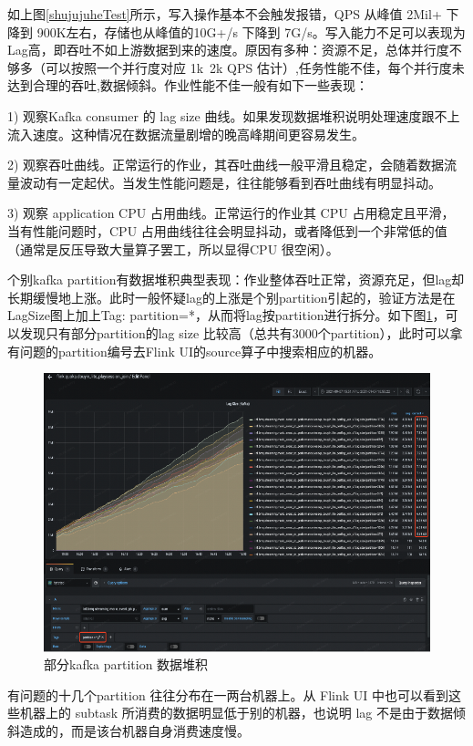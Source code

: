 \begin{longtable}[htbp]
如上图\ref{shujujuheTest}所示，写入操作基本不会触发报错，QPS 从峰值 2Mil+ 下降到 900K左右，存储也从峰值的10G+/s 下降到 7G/s。写入能力不足可以表现为Lag高，即吞吐不如上游数据到来的速度。原因有多种：资源不足，总体并行度不够多（可以按照一个并行度对应 1k~2k QPS 估计）,任务性能不佳，每个并行度未达到合理的吞吐,数据倾斜。作业性能不佳一般有如下一些表现：

1)	观察Kafka consumer 的 lag size 曲线。如果发现数据堆积说明处理速度跟不上流入速度。这种情况在数据流量剧增的晚高峰期间更容易发生。

2)	观察吞吐曲线。正常运行的作业，其吞吐曲线一般平滑且稳定，会随着数据流量波动有一定起伏。当发生性能问题是，往往能够看到吞吐曲线有明显抖动。

3)	观察 application CPU 占用曲线。正常运行的作业其 CPU 占用稳定且平滑，当有性能问题时，CPU 占用曲线往往会明显抖动，或者降低到一个非常低的值（通常是反压导致大量算子罢工，所以显得CPU 很空闲）。

个别kafka partition有数据堆积典型表现：作业整体吞吐正常，资源充足，但lag却长期缓慢地上涨。此时一般怀疑lag的上涨是个别partition引起的，验证方法是在LagSize图上加上Tag: partition=*，从而将lag按partition进行拆分。如下图\ref{bufenkafkaduiji}，可以发现只有部分partition的lag size 比较高（总共有3000个partition），此时可以拿有问题的partition编号去Flink UI的source算子中搜索相应的机器。

\begin{figure}[htbp]
  \centering
  \includegraphics[width=5in]{figure/chapter6/部分kafka partition 数据堆积.png}
  \caption{部分kafka partition 数据堆积}\label{bufenkafkaduiji}
\end{figure}

有问题的十几个partition 往往分布在一两台机器上。从 Flink UI 中也可以看到这些机器上的 subtask 所消费的数据明显低于别的机器，也说明 lag 不是由于数据倾斜造成的，而是该台机器自身消费速度慢。


\end{longtable}

